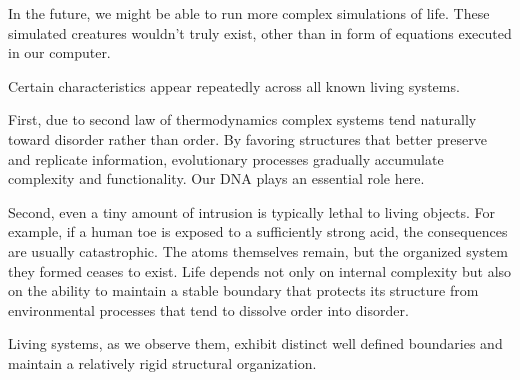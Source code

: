 In the future, we might be able to run more complex simulations of life. These simulated creatures wouldn't truly exist, other than in form of
equations executed in our computer. 

Certain characteristics appear repeatedly across all known living systems.

First, due to second law of thermodynamics complex systems tend naturally toward disorder rather than order. By favoring structures
that better preserve and replicate information, evolutionary processes gradually accumulate complexity and functionality. Our DNA plays
an essential role here.

Second, even a tiny amount of intrusion is typically lethal to living objects.
For example, if a human toe is exposed to a sufficiently strong acid, the consequences are usually catastrophic.
The atoms themselves remain, but the organized system they formed ceases to exist.
Life depends not only on internal complexity but also on the ability to maintain a stable boundary that protects its structure from environmental processes that tend to dissolve order into disorder.

Living systems, as we observe them, exhibit distinct well defined boundaries and maintain a relatively rigid structural organization.

